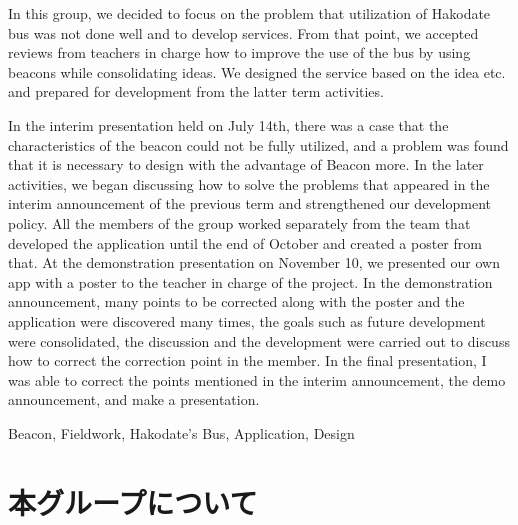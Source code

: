 \documentclass[openany,11pt,papersize]{jsbook}
\begin{document}
\begin{eabstract}

 

In this group, we decided to focus on the problem that utilization of Hakodate bus was not done well and to develop services.
From that point, we accepted reviews from teachers in charge how to improve the use of the bus by using beacons while consolidating ideas.
We designed the service based on the idea etc. and prepared for development from the latter term activities.

In the interim presentation held on July 14th, there was a case that the characteristics of the beacon could not be fully utilized, and a problem was found that it is necessary to design with the advantage of Beacon more.
In the later activities, we began discussing how to solve the problems that appeared in the interim announcement of the previous term and strengthened our development policy.
All the members of the group worked separately from the team that developed the application until the end of October and created a poster from that.
At the demonstration presentation on November 10, we presented our own app with a poster to the teacher in charge of the project.
In the demonstration announcement, many points to be corrected along with the poster and the application were discovered many times, the goals such as future development were consolidated, the discussion and the development were carried out to discuss how to correct the correction point in the member.
In the final presentation, I was able to correct the points mentioned in the interim announcement, the demo announcement, and make a presentation.

\begin{ekeyword}
Beacon, Fieldwork, Hakodate's Bus, Application, Design
\end{ekeyword}
\end{eabstract}

  
  \tableofcontents%
  
  
  \mainmatter%
  
  
  
  
  
  
  \chapter{本グループについて}
\end{document}
